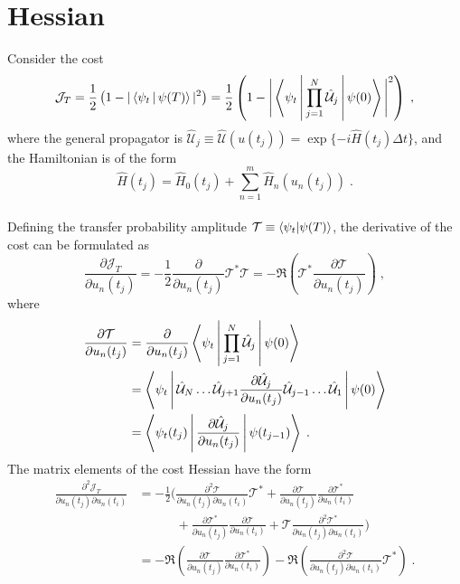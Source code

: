 \section{Hessian}

Consider the cost
\begin{equation}
	\mathcal{J}_T = \frac{1}{2} \left( 1- |\Braket{\psi_t | \psi (T)}|^2 \right)  = \frac{1}{2} \left( 1- \Bigg|\Braket{\psi_t | \prod_{j = 1}^{N} \hat{\mathcal{U}}_j |\psi (0)} \Bigg| ^2 \right) \; ,
\end{equation}
where the general propagator is $\hat{\mathcal{U}}_j \equiv \hat{\mathcal{U}} (u(t_j)) = \exp \{ -i \hat{H} (t_j) \Delta t \}$, and the Hamiltonian is of the form
\begin{equation}
	\hat{H}(t_j) =  \hat{H}_0 (t_j) + \sum_{n = 1}^{m}  \hat{H}_n (u_n (t_j)) \; .
\end{equation}\\
Defining the transfer probability amplitude $\mathcal{T} \equiv \braket{\psi_t | \psi (T)}$, the derivative of the cost can be formulated as
\begin{equation}
	\frac{\partial \mathcal{J}_T}{\partial u_n (t_j)} = - \frac{1}{2} \frac{\partial}{\partial u_n (t_j)}  \mathcal{T}^* \mathcal{T}   = - \Re \left( \mathcal{T}^* \frac{\partial \mathcal{T}}{\partial u_n (t_j)} \right) \; ,
\end{equation}
where
\begin{align}
	\frac{\partial \mathcal{T}}{\partial u_n (t_j)} &= \frac{\partial }{\partial u_n (t_j)} \Braket{\psi_t | \prod_{j = 1}^{N} \hat{\mathcal{U}}_j | \psi (0)} \nonumber \\
	&= \Braket{\psi_t | \hat{\mathcal{U}}_N \ldots \hat{\mathcal{U}}_{j+1} \frac{\partial \hat{\mathcal{U}}_{j}}{\partial u_n (t_j)} \hat{\mathcal{U}}_{j-1} \ldots \hat{\mathcal{U}}_{1} | \psi (0)} \nonumber \\
	&= \Braket{\psi_t (t_j) |  \frac{\partial \hat{\mathcal{U}}_{j}}{\partial u_n (t_j)}  | \psi (t_{j-1})} \; .
	\label{eq:singleDerivT}
\end{align}
The matrix elements of the cost Hessian have the form
\begin{align}
	\frac{\partial^2 \mathcal{J}_T}{\partial u_n (t_j) \partial u_n (t_i)} &= - \frac{1}{2} \bigg( \frac{\partial^2 \mathcal{T}}{\partial u_n (t_j)   \partial u_n (t_i)} \mathcal{T}^* + \frac{\partial \mathcal{T}}{\partial u_n (t_j)} \frac{\partial \mathcal{T}^*}{\partial u_n (t_i)} \nonumber \\
	&\qquad \quad + \frac{\partial \mathcal{T}^*}{\partial u_n (t_j)} \frac{\partial \mathcal{T}}{\partial u_n (t_i)} + \mathcal{T} \frac{\partial^2 \mathcal{T}^*}{\partial u_n (t_j)   \partial u_n (t_i)} \bigg) \nonumber \\
	&= - \Re \left( \frac{\partial \mathcal{T}}{\partial u_n (t_j)} \frac{\partial \mathcal{T}^*}{\partial u_n (t_i)} \right) - \Re \left( \frac{\partial^2 \mathcal{T}}{\partial u_n (t_j)   \partial u_n (t_i)} \mathcal{T}^* \right) \; .
\end{align}
